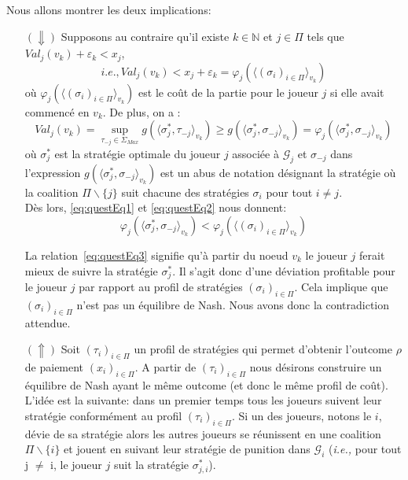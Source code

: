 \begin{demonstration}
	Nous allons montrer les deux implications:\\
	\begin{itemize}
		\item[$(\Downarrow)$] Supposons au contraire qu'il existe $k\in \mathbb{N}$ et $j\in\Pi$ tels que $Val_j(v_k) + \varepsilon_k < x_j$,
		\begin{equation}
			\label{eq:questEq1}
			i.e., Val_j(v_k) < x_j + \varepsilon_k = \varphi_j(\langle (\sigma_i)_{i \in \Pi}\rangle_{v_k})
		\end{equation}
		où $\varphi_j(\langle (\sigma_i)_{i \in \Pi}\rangle_{v_k})$ est le coût de la partie pour le joueur $j$ si elle avait commencé en $v_k$.
		De plus, on a : 
		\begin{equation}
			\label{eq:questEq2}
			Val_j(v_k) = \sup_{\tau_{-j}\in \Sigma_{Max}} g(\langle \sigma^*_j,\tau_{-j} \rangle_{v_k}) \geq g (\langle \sigma^*_j,\sigma_{-j} \rangle_{v_k}) = \varphi_j(\langle \sigma^*_j,\sigma_{-j} \rangle_{v_k})
		\end{equation}
		où $\sigma^*_j$ est la stratégie optimale du joueur $j$ associée à $\mathcal{G}_j$ et $\sigma_{-j}$ dans l'expression $g (\langle \sigma^*_j,\sigma_{-j} \rangle_{v_k})$ est un abus de notation désignant la stratégie où la coalition $\Pi\backslash\{ j \}$ suit chacune des stratégies $\sigma_i$ pour tout $i \neq j$.\\
		
		Dès lors, \eqref{eq:questEq1} et \eqref{eq:questEq2} nous donnent:
		\begin{equation}
			\label{eq:questEq3}
			\varphi_j(\langle \sigma^*_j,\sigma_{-j} \rangle_{v_k}) < \varphi_j(\langle(\sigma_i)_{i\in \Pi}\rangle_{v_k})
		\end{equation}
		
		La relation~\eqref{eq:questEq3} signifie qu'à partir du noeud $v_k$ le joueur $j$ ferait mieux de suivre la stratégie $\sigma^*_j$. Il s'agit donc d'une déviation profitable pour le joueur $j$ par rapport au profil de stratégies $(\sigma_i)_{i\in \Pi}$. Cela implique que $(\sigma_i)_{i\in\Pi}$ n'est pas un équilibre de Nash. Nous avons donc la contradiction attendue.\\
		
		\item[$(\Uparrow)$] Soit $(\tau_i)_{i\in \Pi}$ un profil de stratégies qui permet d'obtenir l'outcome $\rho$ de paiement $(x_i)_{i\in\Pi}$.
		A partir de $(\tau_i)_{i\in \Pi}$ nous désirons construire un équilibre de Nash ayant le même outcome (et donc le même profil de coût).
		L'idée est la suivante: dans un premier temps tous les joueurs suivent leur stratégie conformément au profil $(\tau_i)_{i \in \Pi}$. Si un des joueurs, notons le $i$,  dévie de sa stratégie alors les autres joueurs se réunissent en une coalition $\Pi\backslash \{ i \}$ et jouent en suivant leur stratégie de punition dans $\mathcal{G}_i$ (\emph{i.e.,} pour tout j $\neq$ i, le joueur $j$ suit la stratégie $\sigma^*_{j,i}$).\\
		

\end{itemize}
\end{demonstration}

